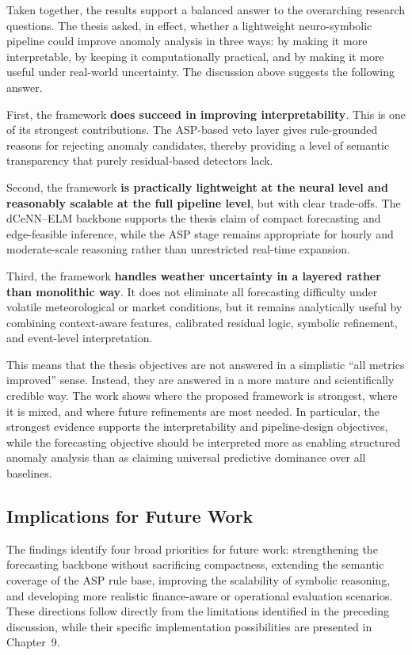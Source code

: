 Taken together, the results support a balanced answer to the overarching research questions. The thesis asked, in effect, whether a lightweight neuro-symbolic pipeline could improve anomaly analysis in three ways: by making it more interpretable, by keeping it computationally practical, and by making it more useful under real-world uncertainty. The discussion above suggests the following answer.

First, the framework \textbf{does succeed in improving interpretability}. This is one of its strongest contributions. The ASP-based veto layer gives rule-grounded reasons for rejecting anomaly candidates, thereby providing a level of semantic transparency that purely residual-based detectors lack.

Second, the framework \textbf{is practically lightweight at the neural level and reasonably scalable at the full pipeline level}, but with clear trade-offs. The dCeNN--ELM backbone supports the thesis claim of compact forecasting and edge-feasible inference, while the ASP stage remains appropriate for hourly and moderate-scale reasoning rather than unrestricted real-time expansion.

Third, the framework \textbf{handles weather uncertainty in a layered rather than monolithic way}. It does not eliminate all forecasting difficulty under volatile meteorological or market conditions, but it remains analytically useful by combining context-aware features, calibrated residual logic, symbolic refinement, and event-level interpretation.

This means that the thesis objectives are not answered in a simplistic ``all metrics improved'' sense. Instead, they are answered in a more mature and scientifically credible way. The work shows where the proposed framework is strongest, where it is mixed, and where future refinements are most needed. In particular, the strongest evidence supports the interpretability and pipeline-design objectives, while the forecasting objective should be interpreted more as enabling structured anomaly analysis than as claiming universal predictive dominance over all baselines.

\subsection{Implications for Future Work}

The findings identify four broad priorities for future work: strengthening the forecasting backbone without sacrificing compactness, extending the semantic coverage of the ASP rule base, improving the scalability of symbolic reasoning, and developing more realistic finance-aware or operational evaluation scenarios. These directions follow directly from the limitations identified in the preceding discussion, while their specific implementation possibilities are presented in Chapter~9.

